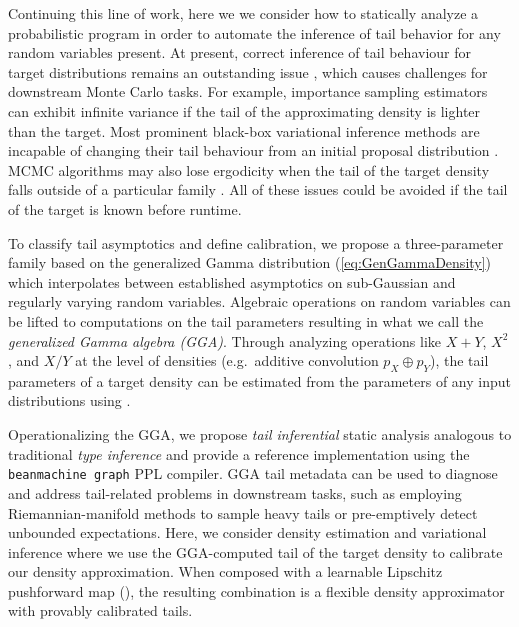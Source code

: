\documentclass[../thesis.tex]{subfiles}
\begin{document}
Continuing this line of work, here we
we consider how to statically analyze a probabilistic program in order to automate the inference of
tail behavior for any
random variables present. At present, correct inference of tail behaviour for target distributions remains an outstanding issue \citep{yao2018yes,wang2018variational}, which causes challenges for downstream Monte Carlo tasks. For example, importance sampling estimators can exhibit infinite variance if the tail of the approximating density is lighter than the target. Most prominent black-box variational inference methods are incapable of changing their tail behaviour from an initial proposal distribution \citep{jaini2020tails,ftvi}. MCMC algorithms may also lose ergodicity when the tail of the target density falls outside of a particular family \citep{roberts1996exponential}. All of these issues could be avoided if the tail of the target is known before runtime.

To classify tail asymptotics and define calibration, we propose a three-parameter
family based on the generalized Gamma distribution (\cref{eq:GenGammaDensity})
which interpolates between established asymptotics on sub-Gaussian \citep{ledoux2001concentration}
and regularly varying \citep{mikosch} random variables.
Algebraic operations on random variables
can be lifted to computations on the tail parameters resulting in what we call the \emph{generalized Gamma algebra (GGA)}.
Through analyzing operations like $X + Y$, $X^2$, and $X / Y$ at the level of densities (e.g.\ additive convolution $p_X \oplus p_Y$), the tail parameters of a target density can be estimated from the parameters of any input distributions using .

Operationalizing the GGA, we propose \emph{tail inferential} static analysis analogous to traditional \emph{type inference} and provide a reference implementation using the \texttt{beanmachine graph} \citep{tehrani2020bean}
PPL compiler.
GGA tail metadata can be used to diagnose and address tail-related problems in downstream tasks, such as
employing Riemannian-manifold methods \citep{girolami2011riemann} to sample heavy tails
or pre-emptively detect unbounded expectations.
Here, we consider density estimation and variational inference where we use the GGA-computed tail of the target density to calibrate our density approximation.
%
%
%
When composed with a learnable Lipschitz pushforward map (),
the resulting combination is a flexible density approximator with provably calibrated tails.
\end{document}
